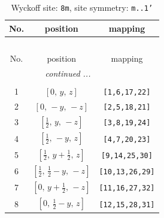 \documentclass[fleqn,8pt]{jsarticle}
\begin{document}
\begin{longtable}{ccc}
\caption{Wyckoff site: {\tt 8m}, site symmetry: {\tt m..1'}}
 \\
 \hline \hline
No. & position & mapping \\ \hline \endfirsthead

\multicolumn{2}{l}{\tablename\ \thetable{}} \\
 \hline \hline
No. & position & mapping \\ \hline \endhead

 \hline \hline
\multicolumn{2}{r}{\footnotesize\it continued ...} \\ \endfoot

 \hline \hline
\multicolumn{2}{r}{} \\ \endlastfoot

1 & $\left[ 0,\, y,\, z \right]$ & {\tt [1,6,17,22]} \\ \hline
2 & $\left[ 0,\, - y,\, - z \right]$ & {\tt [2,5,18,21]} \\ \hline
3 & $\left[ \frac{1}{2},\, y,\, - z \right]$ & {\tt [3,8,19,24]} \\ \hline
4 & $\left[ \frac{1}{2},\, - y,\, z \right]$ & {\tt [4,7,20,23]} \\ \hline
5 & $\left[ \frac{1}{2},\, y + \frac{1}{2},\, z \right]$ & {\tt [9,14,25,30]} \\ \hline
6 & $\left[ \frac{1}{2},\, \frac{1}{2} - y,\, - z \right]$ & {\tt [10,13,26,29]} \\ \hline
7 & $\left[ 0,\, y + \frac{1}{2},\, - z \right]$ & {\tt [11,16,27,32]} \\ \hline
8 & $\left[ 0,\, \frac{1}{2} - y,\, z \right]$ & {\tt [12,15,28,31]} \\
\end{longtable}
\renewcommand{\arraystretch}{1.2}
\end{document}

